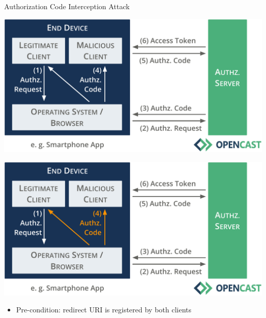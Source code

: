 \documentclass[aspectratio=169]{beamer}
\begin{document}
\begin{frame}{Authorization Code Interception Attack}
	\vspace*{0.5em}
	\begin{overprint}
		\centerline{\includegraphics[height=0.7\textheight]{figures/authorization-code-interception-01}}
		\centerline{\includegraphics[height=0.7\textheight]{figures/authorization-code-interception-02}}
	\end{overprint}
	\begin{itemize}
		\item<3> Pre-condition: redirect URI is registered by both clients
	\end{itemize}
	\vspace*{-1.5em}
\end{frame}
\end{document}
